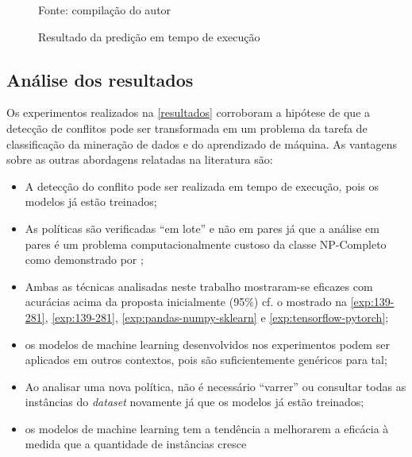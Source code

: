 \begin{figure}[H]
	\centering
	\caption{Resultado da predição em tempo de execução}
	
	\label{fig:resultado-compara}
	{\scriptsize Fonte: compilação do autor}
\end{figure}





\subsection{Análise dos resultados}\label{analise_resultados}
Os experimentos realizados na \autoref{resultados} corroboram a hipótese de que a detecção de conflitos pode ser transformada em um problema da tarefa de classificação da mineração de dados e do aprendizado de máquina. As vantagens sobre as outras abordagens relatadas na literatura são:
\begin{itemize}
	\item A detecção do conflito pode ser realizada em tempo de execução, pois os modelos já estão treinados;	
	\item As políticas são verificadas ``em lote'' e não em pares já que a análise em pares é um problema computacionalmente custoso da classe NP-Completo como demonstrado por ; 
	\item Ambas as técnicas analisadas neste trabalho mostraram-se eficazes com acurácias acima da proposta inicialmente (95\%) cf. o mostrado na \autoref{exp:139-281}, \autoref{exp:139-281}, \autoref{exp:pandas-numpy-sklearn} e \autoref{exp:tensorflow-pytorch};
	\item os modelos de machine learning desenvolvidos nos experimentos podem ser aplicados em outros contextos, pois são suficientemente genéricos para tal;
	\item Ao analisar uma nova política, não é necessário ``varrer'' ou consultar todas as instâncias do \textit{dataset} novamente já que os modelos já estão treinados;
	\item os modelos de machine learning tem a tendência a melhorarem a eficácia à medida que a quantidade de instâncias cresce
\end{itemize}

